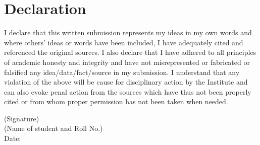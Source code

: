 \chapter*{Declaration}
I declare that this written submission represents my ideas in my own words and where others' ideas or words have been included, I have adequately cited and referenced the original sources. I also declare that I have adhered to all principles of academic honesty and integrity and have not misrepresented or fabricated or falsified any idea/data/fact/source in my submission. I understand that any violation of the above will be cause for disciplinary action by the Institute and can also evoke penal action from the sources which have thus not been properly cited or from whom proper permission has not been taken when needed.

\vspace{1cm}
\begin{flushright}
	(Signature) \\[0.5cm]
	(Name of student and Roll No.) \\
	Date:
\end{flushright}